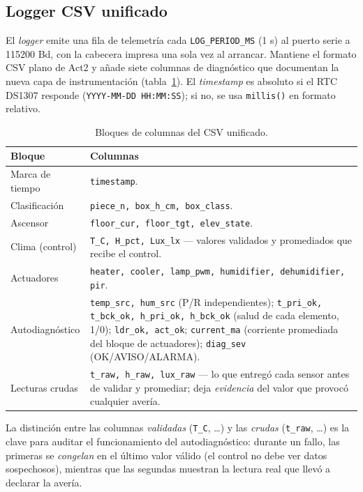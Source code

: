\subsection{Logger CSV unificado}

El \emph{logger} emite una fila de telemetría cada \texttt{LOG\_PERIOD\_MS}
(1 s) al puerto serie a 115200 Bd, con la cabecera
impresa una sola vez al arrancar. Mantiene el formato CSV plano de Act2 y
añade siete columnas de diagnóstico que documentan la nueva capa de
instrumentación (tabla~\ref{tab:csv}). El \emph{timestamp} es absoluto si
el RTC DS1307 responde (\texttt{YYYY-MM-DD HH:MM:SS}); si no, se usa
\texttt{millis()} en formato relativo.

\begin{table}[H]
  \centering
  \small
  \begin{tabular}{p{} p{}}
    \toprule
    \textbf{Bloque} & \textbf{Columnas} \\
    \midrule
    Marca de tiempo & \texttt{timestamp}. \\
    Clasificación   & \texttt{piece\_n, box\_h\_cm, box\_class}. \\
    Ascensor        & \texttt{floor\_cur, floor\_tgt, elev\_state}. \\
    Clima (control) & \texttt{T\_C, H\_pct, Lux\_lx} --- valores validados y
                      promediados que recibe el control. \\
    Actuadores      & \texttt{heater, cooler, lamp\_pwm, humidifier,
                      dehumidifier, pir}. \\
    Autodiagnóstico & \texttt{temp\_src, hum\_src} (P/R independientes);
                      \texttt{t\_pri\_ok, t\_bck\_ok, h\_pri\_ok, h\_bck\_ok}
                      (salud de cada elemento, 1/0); \texttt{ldr\_ok,
                      act\_ok}; \texttt{current\_ma} (corriente promediada
                      del bloque de actuadores); \texttt{diag\_sev}
                      (\textsf{OK}/\textsf{AVISO}/\textsf{ALARMA}). \\
    Lecturas crudas & \texttt{t\_raw, h\_raw, lux\_raw} --- lo que entregó
                      cada sensor antes de validar y promediar; deja
                      \emph{evidencia} del valor que provocó cualquier
                      avería. \\
    \bottomrule
  \end{tabular}
  \caption{Bloques de columnas del CSV unificado.}
  \label{tab:csv}
\end{table}

La distinción entre las columnas \emph{validadas} (\texttt{T\_C}, \ldots) y
las \emph{crudas} (\texttt{t\_raw}, \ldots) es la clave para auditar el
funcionamiento del autodiagnóstico: durante un fallo, las primeras se
\emph{congelan} en el último valor válido (el control no debe ver datos
sospechosos), mientras que las segundas muestran la lectura real que llevó a
declarar la avería.
